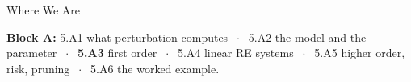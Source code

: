 

\graphicspath{{./figures/}}





\makedecktitle

\begin{frame}{Where We Are}
\vspace{-1mm}
\begin{center}
\small \textbf{Block A:} 5.A1 what perturbation computes $\;\cdot\;$ 5.A2 the model and the parameter $\;\cdot\;$ \textbf{5.A3} first order $\;\cdot\;$ 5.A4 linear RE systems $\;\cdot\;$ 5.A5 higher order, risk, pruning $\;\cdot\;$ 5.A6 the worked example.
\end{center}
\end{frame}

